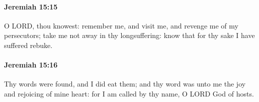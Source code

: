 		\paragraph{Jeremiah 15:15} %
			\label{JEREMIAH-15-15}

			O LORD, thou knowest: remember me, and visit me, and revenge me of my persecutors; take me not away in thy longsuffering: know that for thy sake I have suffered rebuke.


		\paragraph{Jeremiah 15:16} %
			\label{JEREMIAH-15-16}

			Thy words were found, and I did eat them; and thy word was unto me the joy and rejoicing of mine heart: for I am called by thy name, O LORD God of hosts.


